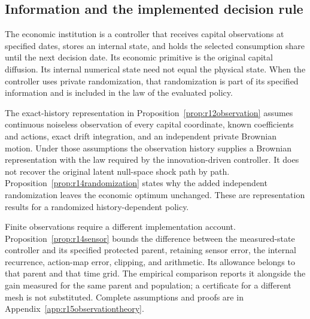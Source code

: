\subsection{Information and the implemented decision rule}\label{sec:r15implementation}
The economic institution is a controller that receives capital observations at specified dates, stores an internal state, and holds the selected consumption share until the next decision date. Its economic primitive is the original capital diffusion. Its internal numerical state need not equal the physical state. When the controller uses private randomization, that randomization is part of its specified information and is included in the law of the evaluated policy.

The exact-history representation in Proposition~\ref{prop:r12observation} assumes continuous noiseless observation of every capital coordinate, known coefficients and actions, exact drift integration, and an independent private Brownian motion. Under those assumptions the observation history supplies a Brownian representation with the law required by the innovation-driven controller. It does not recover the original latent null-space shock path by path. Proposition~\ref{prop:r14randomization} states why the added independent randomization leaves the economic optimum unchanged. These are representation results for a randomized history-dependent policy.

Finite observations require a different implementation account. Proposition~\ref{prop:r14sensor} bounds the difference between the measured-state controller and its specified protected parent, retaining sensor error, the internal recurrence, action-map error, clipping, and arithmetic. Its allowance belongs to that parent and that time grid. The empirical comparison reports it alongside the gain measured for the same parent and population; a certificate for a different mesh is not substituted. Complete assumptions and proofs are in Appendix~\ref{app:r15observationtheory}.

